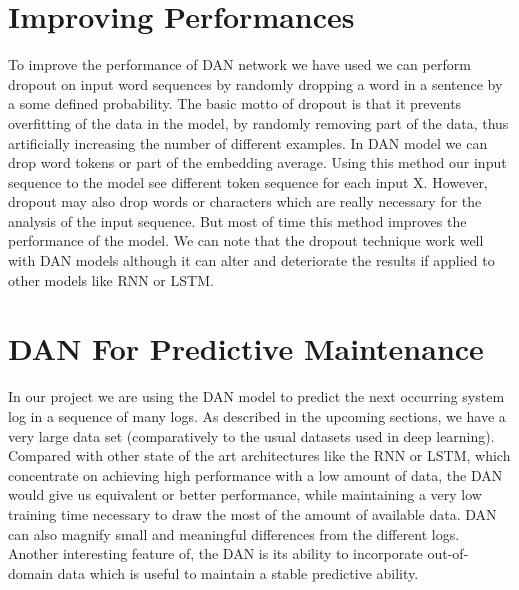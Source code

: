 \section{Improving Performances}
To improve the performance of DAN network we have used we can perform dropout on input word sequences by randomly dropping a word in a sentence by a some defined probability. The basic motto of dropout is that it prevents overfitting of the data in the model, by randomly removing part of the data, thus artificially increasing the number of different examples.
In DAN model we can drop word tokens or part of the embedding average. Using this method our input sequence to the model see different token sequence for each input X. However, dropout may also drop words or characters which are really necessary for  the analysis of the input sequence. But most of time this method improves the performance of the model.
We can note that the dropout technique work well with DAN models although it can alter and deteriorate the results if applied to other models like RNN or LSTM.

\section{DAN For Predictive Maintenance}
In our project we are using the DAN model to predict the next occurring system log in a sequence of many logs. As described in the upcoming sections, we have a very large data set (comparatively to the usual datasets used in deep learning). Compared with other state of the art architectures like the RNN or LSTM, which concentrate on achieving high performance with a low amount of data, the DAN would give us equivalent or better performance, while maintaining a very low training time necessary to draw the most of the amount of available data.
DAN can also magnify small and meaningful differences from the different logs. Another interesting feature of, the DAN is its ability to incorporate out-of-domain data which is useful to maintain a stable predictive ability.
